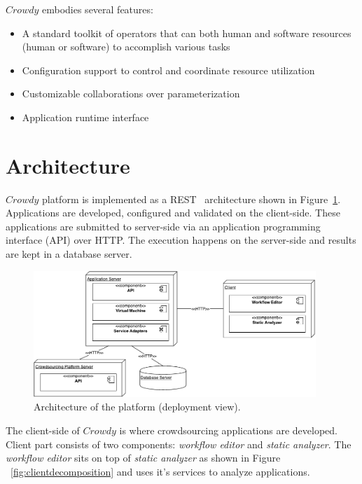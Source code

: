 $Crowdy$ embodies several features:
\begin{itemize}
	\item A standard toolkit of operators that can both human and software resources 
	(human or software) to accomplish various tasks
	\item Configuration support to control and coordinate resource utilization 
	\item Customizable collaborations over parameterization
	\item Application runtime interface
\end{itemize}

\section{Architecture}

$Crowdy$ platform is implemented as a REST~\cite{Richardson2008} architecture 
shown in Figure~\ref{fig:deployment}. Applications are developed, configured and 
validated on the client-side. These applications are submitted to server-side via an 
application programming interface (API) over HTTP. The execution happens on the 
server-side and results are kept in a database server.


\begin{figure}[ht]
	\centering
	\includegraphics[width=0.95\textwidth]{figures/architecture/Deployment.pdf}
	\caption{Architecture of the platform (deployment view).}
	\label{fig:deployment}
\end{figure}

The client-side of $Crowdy$ is where crowdsourcing applications are developed. Client 
part consists of two components: \textit{workflow editor} and \textit{static analyzer}. The 
\textit{workflow editor} sits on top of \textit{static analyzer} as shown in Figure
~\ref{fig:clientdecomposition} and uses it's services to analyze applications.

